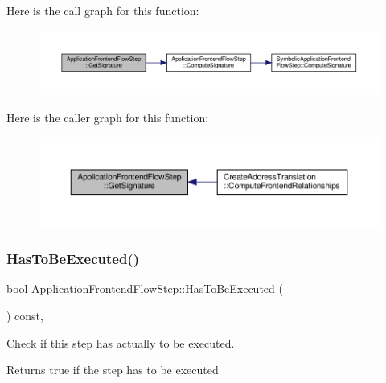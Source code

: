 Here is the call graph for this function\+:
\nopagebreak
\begin{figure}[H]
\begin{center}
\leavevmode
\includegraphics[width=350pt]{d7/d7f/classApplicationFrontendFlowStep_a25500677dc27a20d35bdb4b45bfdba42_cgraph}
\end{center}
\end{figure}
Here is the caller graph for this function\+:
\nopagebreak
\begin{figure}[H]
\begin{center}
\leavevmode
\includegraphics[width=350pt]{d7/d7f/classApplicationFrontendFlowStep_a25500677dc27a20d35bdb4b45bfdba42_icgraph}
\end{center}
\end{figure}
\mbox{\label{classApplicationFrontendFlowStep_ad99f4dcbab470c65eea79ae0291a4bd5}} 
\subsubsection{\texorpdfstring{Has\+To\+Be\+Executed()}{HasToBeExecuted()}}
{\footnotesize\ttfamily bool Application\+Frontend\+Flow\+Step\+::\+Has\+To\+Be\+Executed (\begin{DoxyParamCaption}{ }\end{DoxyParamCaption}) const\hspace{0.3cm}{\ttfamily [override]}, {\ttfamily [virtual]}}



Check if this step has actually to be executed. 

\begin{DoxyReturn}{Returns}
true if the step has to be executed 
\end{DoxyReturn}


